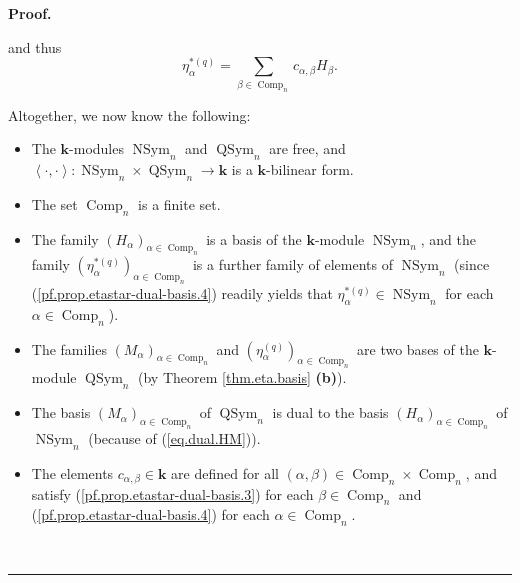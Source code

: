 \documentclass[numbers=enddot,12pt,final,onecolumn,notitlepage]{scrartcl}%
\theoremstyle{definition}
\newenvironment{proof}[1][Proof]{\noindent\textbf{#1.} }{\ \rule{0.5em}{0.5em}}
\let\sumnonlimits\sum
\renewcommand{\sum}{\sumnonlimits\limits}
\newenvironment{verlong}{}{}
\begin{document}
\begin{proof}
\begin{verlong}
\end{verlong}

\noindent and thus%
\begin{equation}
\eta_{\alpha}^{\ast\left(  q\right)  }=\sum_{\beta\in\operatorname*{Comp}%
\nolimits_{n}}c_{\alpha,\beta}H_{\beta}. \label{pf.prop.etastar-dual-basis.4}%
\end{equation}


Altogether, we now know the following:

\begin{itemize}
\item The $\mathbf{k}$-modules $\operatorname*{NSym}\nolimits_{n}$ and
$\operatorname*{QSym}\nolimits_{n}$ are free, and $\left\langle \cdot
,\cdot\right\rangle :\operatorname*{NSym}\nolimits_{n}\times
\operatorname*{QSym}\nolimits_{n}\rightarrow\mathbf{k}$ is a $\mathbf{k}%
$-bilinear form.

\item The set $\operatorname*{Comp}\nolimits_{n}$ is a finite set.

\item The family $\left(  H_{\alpha}\right)  _{\alpha\in\operatorname*{Comp}%
\nolimits_{n}}$ is a basis of the $\mathbf{k}$-module $\operatorname*{NSym}%
\nolimits_{n}$, and the family $\left(  \eta_{\alpha}^{\ast\left(  q\right)
}\right)  _{\alpha\in\operatorname*{Comp}\nolimits_{n}}$ is a further family
of elements of $\operatorname*{NSym}\nolimits_{n}$ (since
(\ref{pf.prop.etastar-dual-basis.4}) readily yields that $\eta_{\alpha}%
^{\ast\left(  q\right)  }\in\operatorname*{NSym}\nolimits_{n}$ for each
$\alpha\in\operatorname*{Comp}\nolimits_{n}$).

\item The families $\left(  M_{\alpha}\right)  _{\alpha\in\operatorname*{Comp}%
\nolimits_{n}}$ and $\left(  \eta_{\alpha}^{\left(  q\right)  }\right)
_{\alpha\in\operatorname*{Comp}\nolimits_{n}}$ are two bases of the
$\mathbf{k}$-module $\operatorname*{QSym}\nolimits_{n}$ (by Theorem
\ref{thm.eta.basis} \textbf{(b)}).

\item The basis $\left(  M_{\alpha}\right)  _{\alpha\in\operatorname*{Comp}%
\nolimits_{n}}$ of $\operatorname*{QSym}\nolimits_{n}$ is dual to the basis
$\left(  H_{\alpha}\right)  _{\alpha\in\operatorname*{Comp}\nolimits_{n}}$ of
$\operatorname*{NSym}\nolimits_{n}$ (because of (\ref{eq.dual.HM})).

\item The elements $c_{\alpha,\beta}\in\mathbf{k}$ are defined for all
$\left(  \alpha,\beta\right)  \in\operatorname*{Comp}\nolimits_{n}%
\times\operatorname*{Comp}\nolimits_{n}$, and satisfy
(\ref{pf.prop.etastar-dual-basis.3}) for each $\beta\in\operatorname*{Comp}%
\nolimits_{n}$ and (\ref{pf.prop.etastar-dual-basis.4}) for each $\alpha
\in\operatorname*{Comp}\nolimits_{n}$.
\end{itemize}


\end{proof}
\end{document}
